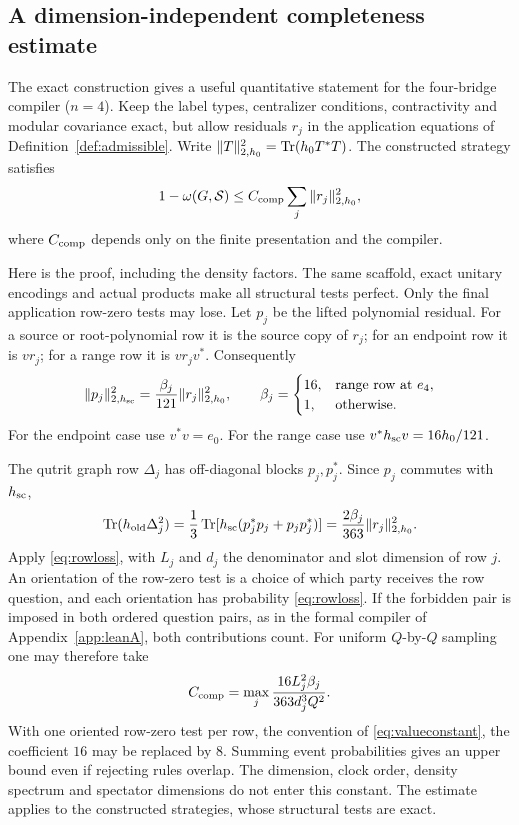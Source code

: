 \subsection{A dimension-independent completeness estimate}\label{sec:approxcompiler}
The exact construction gives a useful quantitative statement for the four-bridge compiler ($n=4$). Keep the label types, centralizer conditions, contractivity and modular covariance exact, but allow residuals $r_j$ in the application equations of Definition~\ref{def:admissible}. Write $\|T\|_{2,h_0}^2=\operatorname{Tr}(h_0T^*T)$. The constructed strategy satisfies
\begin{equation}\label{eq:generalestimate}
 1-\omega(G,\mathcal S)\leq C_{\rm comp}\sum_j\|r_j\|_{2,h_0}^2,
\end{equation}
where $C_{\rm comp}$ depends only on the finite presentation and the compiler.

Here is the proof, including the density factors. The same scaffold, exact unitary encodings and actual products make all structural tests perfect. Only the final application row-zero tests may lose. Let $p_j$ be the lifted polynomial residual. For a source or root-polynomial row it is the source copy of $r_j$; for an endpoint row it is $vr_j$; for a range row it is $vr_jv^*$. Consequently
\[
 \|p_j\|_{2,h_{\rm sc}}^2=\frac{\beta_j}{121}\|r_j\|_{2,h_0}^2,
 \qquad \beta_j=\begin{cases}16,&\text{range row at }e_4,\\1,&\text{otherwise}.\end{cases}
\]
For the endpoint case use $v^*v=e_0$. For the range case use $v^*h_{\rm sc}v=16h_0/121$.

The qutrit graph row $\Delta_j$ has off-diagonal blocks $p_j,p_j^*$. Since $p_j$ commutes with $h_{\rm sc}$,
\[
 \operatorname{Tr}(h_{\rm old}\Delta_j^2)
 =\frac13\operatorname{Tr}[h_{\rm sc}(p_j^*p_j+p_jp_j^*)]
 =\frac{2\beta_j}{363}\|r_j\|_{2,h_0}^2.
\]
Apply \eqref{eq:rowloss}, with $L_j$ and $d_j$ the denominator and slot dimension of row $j$. An orientation of the row-zero test is a choice of which party receives the row question, and each orientation has probability \eqref{eq:rowloss}. If the forbidden pair is imposed in both ordered question pairs, as in the formal compiler of Appendix~\ref{app:leanA}, both contributions count. For uniform $Q$-by-$Q$ sampling one may therefore take
\begin{equation}\label{eq:generalconstant}
 C_{\rm comp}=\max_j\frac{16L_j^2\beta_j}{363d_j^3Q^2}.
\end{equation}
With one oriented row-zero test per row, the convention of \eqref{eq:valueconstant}, the coefficient $16$ may be replaced by $8$. Summing event probabilities gives an upper bound even if rejecting rules overlap. The dimension, clock order, density spectrum and spectator dimensions do not enter this constant. The estimate applies to the constructed strategies, whose structural tests are exact.
